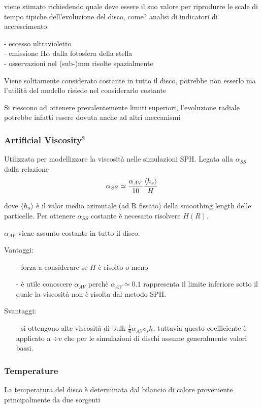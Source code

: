 \documentclass[DIN, pagenumber=false, fontsize=11pt, parskip=half]{scrartcl}
\begin{document}
viene stimato richiedendo quale deve essere il suo valore per riprodurre le scale di tempo tipiche dell'evoluzione del disco, come? analisi di indicatori di accrescimento:

- eccesso ultravioletto \\
- emissione H$\alpha$  dalla fotosfera della stella\\
- osservazioni nel (sub-)mm risolte spazialmente

Viene solitamente considerato costante in tutto il disco, potrebbe non esserlo ma l'utilità del modello risiede nel considerarlo costante

Si riescono ad ottenere prevalentemente limiti superiori, l'evoluzione radiale potrebbe infatti essere dovuta anche ad altri meccanismi

\subsubsection{Artificial Viscosity\hyperref[source]{$^2$}}
\label{artvisc}

Utilizzata per modellizzare la viscosità nelle simulazioni SPH.
Legata alla $\alpha_{SS}$ dalla relazione 
\begin{equation}
\alpha_{SS} \simeq \frac{\alpha_{AV}}{10}\frac{\ev{h_s}}{H}
\end{equation}

dove $\ev{h_s}$ è il valor medio azimutale (ad R fissato) della smoothing length delle particelle.
Per ottenere $\alpha_{SS}$ costante è necesario risolvere $H(R)$.

$\alpha_{AV}$ viene assunto costante in tutto il disco.

Vantaggi:
\begin{enumerate}
 \item[-] forza a considerare se $H$ è risolto o meno
 \item[-] è utile conoscere $\alpha_{AV}$ perchè $\alpha_{AV} \simeq 0.1$ rappresenta il limite inferiore sotto il quale la viscosità non è risolta dal metodo SPH.
\end{enumerate}

Svantaggi:
\begin{enumerate}
 \item[-] si ottengono alte viscosità di bulk $\frac 16 \alpha_{AV} c_s h$, tuttavia questo coefficiente è applicato a $\div v$ che per le simulazioni di dischi assume generalmente valori bassi.
\end{enumerate}


\subsubsection{Temperature}
\label{temp}
La temperatura del disco è determinata dal bilancio di calore proveniente principalmente da due sorgenti
\end{document}

